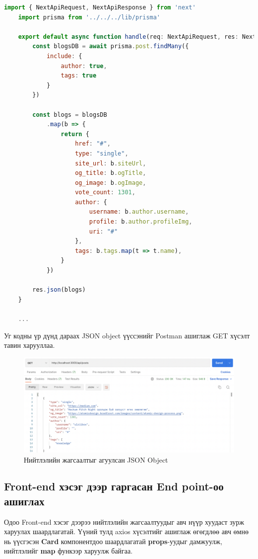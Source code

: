 \begin{lstlisting}[language=Javascript, caption=Next.js дээрээ end point гаргах, frame=single]
	import { NextApiRequest, NextApiResponse } from 'next'
	import prisma from '../../../lib/prisma'
	
	export default async function handle(req: NextApiRequest, res: NextApiResponse) {
		const blogsDB = await prisma.post.findMany({
			include: {
				author: true,
				tags: true
			}
		})
	
		const blogs = blogsDB
			.map(b => {
				return {
					href: "#",
					type: "single",
					site_url: b.siteUrl,
					og_title: b.ogTitle,
					og_image: b.ogImage,
					vote_count: 1301,
					author: {
						username: b.author.username,
						profile: b.author.profileImg,
						uri: "#"
					},
					tags: b.tags.map(t => t.name),
				}
			})
	
		res.json(blogs)
	}

	...

\end{lstlisting}

Уг кодны үр дүнд дараах JSON object үүссэнийг Postman ашиглаж GET хүсэлт тавин харууллаа.

\begin{figure}[h]
	\centering
	\includegraphics[width=13cm]{images/implement/endpoint.png}
	\caption{Нийтлэлийн жагсаалтыг агуулсан JSON Object}
	\label{fig:endpoint}
\end{figure}

\subsection{Front-end хэсэг дээр гаргасан End point-оо ашиглах}

Одоо Front-end хэсэг дээрээ нийтлэлийн жагсаалтуудыг авч нүүр хуудаст зурж харуулах шаардлагатай. Үүний тулд axios хүсэлтийг ашиглаж өгөгдлөө авч өмнө нь үүсгэсэн \textbf{Card} компонентдоо шаардлагатай \textbf{props}-уудыг дамжуулж, нийтлэлийг \textbf{map} функээр харуулж байгаа. 

